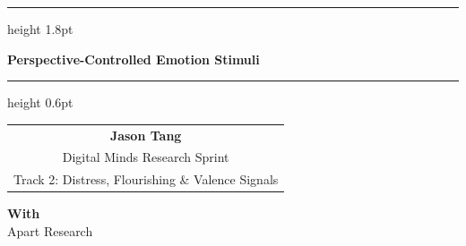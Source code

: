 \documentclass[11pt]{article}
\begin{document}
\vspace*{0.2in}
\hrule height 1.8pt
\vspace{0.45in}
\begin{center}
{\LARGE\bfseries Perspective-Controlled Emotion Stimuli\footnotemark[1] \par}
\end{center}
\vspace{0.3in}
\hrule height 0.6pt
\vspace{0.5in}


\begin{center}
\begin{tabular}{c}
    \textbf{Jason Tang} \\
    Digital Minds Research Sprint \\
    Track 2: Distress, Flourishing \& Valence Signals
\end{tabular}

\vspace{0.2in}
\textbf{With}\\
Apart Research
\end{center}

\vspace{0.35in}
\end{document}

